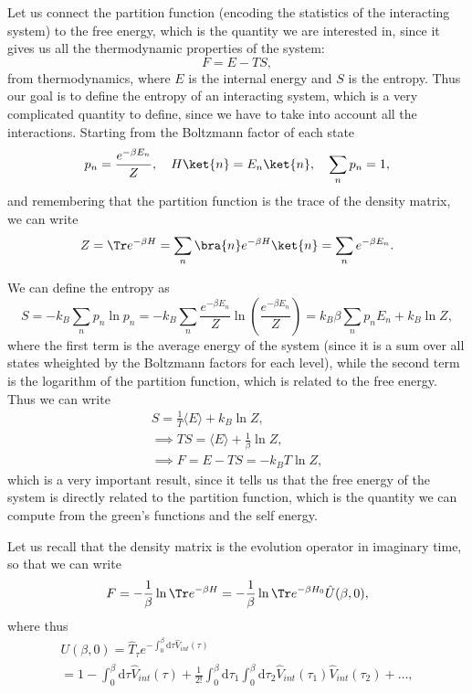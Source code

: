 Let us connect the partition function (encoding the statistics of the interacting system) to the free energy, which is the quantity we are interested in, since it gives us all the thermodynamic properties of the system:
\[
    F = E - TS,
\]
from thermodynamics, where \(E\) is the internal energy and \(S\) is the entropy. Thus our goal is to define the entropy of an interacting system, which is a very complicated quantity to define, since we have to take into account all the interactions. Starting from the Boltzmann factor of each state
\[
    p_n = \frac{e^{-\beta E_n}}{Z}, \quad H \ket{n} = E_n \ket{n}, \quad \sum_{n} p_n = 1,
\]
and remembering that the partition function is the trace of the density matrix, we can write
\[
    Z = \Tr e^{-\beta H} = \sum_{n} \bra{n} e^{-\beta H} \ket{n} = \sum_{n} e^{-\beta E_n}.
\]

We can define the entropy as
\[
    S = -k_B \sum_{n} p_n \ln p_n = -k_B \sum_{n} \frac{e^{-\beta E_n}}{Z} \ln \left( \frac{e^{-\beta E_n}}{Z} \right) = k_B \beta \sum_{n} p_n E_n + k_B \ln Z,
\]
where the first term is the average energy of the system (since it is a sum over all states wheighted by the Boltzmann factors for each level), while the second term is the logarithm of the partition function, which is related to the free energy. Thus we can write
\[
    \begin{aligned}
        S = \frac{1}{T} \langle E \rangle + k_B \ln Z,           \\
        \implies TS = \langle E \rangle + \frac{1}{\beta} \ln Z, \\
        \implies F = E - TS = -k_B T \ln Z,
    \end{aligned}
\]
which is a very important result, since it tells us that the free energy of the system is directly related to the partition function, which is the quantity we can compute from the green's functions and the self energy.

Let us recall that the density matrix is the evolution operator in imaginary time, so that we can write
\[
    F = - \frac{1}{\beta} \ln \Tr e^{-\beta H} = - \frac{1}{\beta} \ln \Tr e^{-\beta H_0} \hat{U}(\beta, 0),
\]
where thus
\[
    \begin{aligned}
        U(\beta, 0) = \hat{T}_{\tau} e^{-\int_0^{\beta} \mathrm{d} \tau \hat{V}_{int}(\tau)} \\
        = 1 - \int_0^{\beta} \mathrm{d} \tau \hat{V}_{int}(\tau) + \frac{1}{2!} \int_0^{\beta} \mathrm{d} \tau_1 \int_0^{\beta} \mathrm{d} \tau_2 \hat{V}_{int}(\tau_1) \hat{V}_{int}(\tau_2) + \dots,
    \end{aligned}
\]

